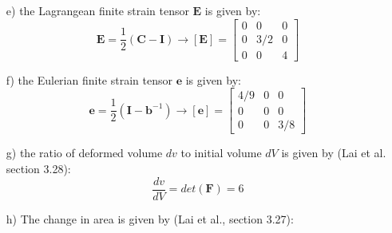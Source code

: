 \documentclass{article}
\newcommand{\ee}{\end{equation}}
\newcommand{\be}{\begin{equation}}
\newcommand{\bs}{\boldsymbol}
\begin{document}
\begin{enumerate}
\item[e)] the Lagrangean finite  strain tensor $\bs{E}$  is given by:
\be
\bs{E}=\frac{1}{2}(\bs{C} -\bs{I}) \to [\bs{E}]=\left[ \begin{array}{lll} 0 & 0 & 0 \\0 & 3/2 & 0 \\0 & 0 & 4 \end{array} \right]
\ee

\item[f)] the Eulerian finite  strain tensor $\bs{e}$ is given by:
\be
\bs{e}=\frac{1}{2}(\bs{I} -\bs{b}^{-1}) \to [\bs{e}]=\left[ \begin{array}{lll} 4/9 & 0 & 0 \\0 & 0 & 0 \\0 & 0 & 3/8 \end{array} \right]
\ee


\item[g)] the ratio of deformed volume $dv$ to initial volume $dV$ is given by (Lai et al. section 3.28):
\be
\frac{dv}{dV}=det(\bs{F})=6
\ee


\item[h)] The change in area is given by (Lai et al., section 3.27):
 

\end{enumerate}
\end{document}
